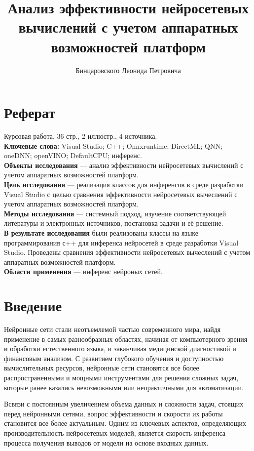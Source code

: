 \documentclass[a4paper,14pt]{extreport}
\title{Анализ эффективности нейросетевых вычислений с учетом аппаратных возможностей платформ}
\author{Бинцаровского Леонида Петровича}
\begin{document}
    \maketitle\newpage
    
    \chapter*{Реферат}
    Курсовая работа, 36 стр., 2 иллюстр., 4 источника.\\
    \textbf{Ключевые слова:} Visual Studio; C++; Onnxruntime; DirectML; QNN; oneDNN; openVINO; DefaultCPU; инференс.\\
    \textbf{Объекты исследования} — анализ эффективности нейросетевых вычислений с учетом аппаратных возможностей платформ.\\
    \textbf{Цель исследования} — реализация классов для инференсов в среде разработки Visual Studio с целью сравнения эффективности нейросетевых вычеслений с учетом аппаратных возможностей платформ.\\
    \textbf{Методы исследования} — системный подход, изучение соответствующей литературы и электронных источников, постановка задачи и её решение.\\
    \textbf{В результате исследования} были реализованы классы на языке программирования с++ для инференса нейросетей в среде разработки Visual Studio. Проведены сравнения эффективности нейросетевых вычеслений с учетом аппаратных возможностей платформ.\\
    \textbf{Области применения} — инференс нейроных сетей.
    
    \tableofcontents\newpage
    \chapter*{Введение}
    Нейронные сети стали неотъемлемой частью современного мира, найдя применение в самых разнообразных областях, начиная от компьютерного зрения и обработки естественного языка, и заканчивая медицинской диагностикой и финансовым анализом. С развитием глубокого обучения и доступностью вычислительных ресурсов, нейронные сети становятся все более распространенными и мощными инструментами для решения сложных задач, которые ранее казались невозможными или непрактичными для автоматизации. 

    Всвязи с постоянным увеличением объема данных и сложности задач, стоящих перед нейронными сетями, вопрос эффективности и скорости их работы становится все более актуальным. Одним из ключевых аспектов, определяющих производительность нейросетевых моделей, является скорость инференса - процесса получения выводов от модели на основе входных данных.
\end{document}
